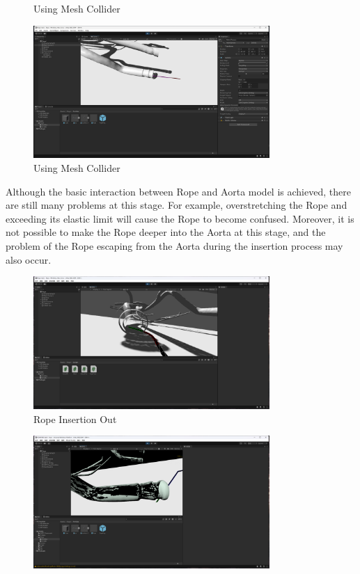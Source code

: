 \documentclass[12pt]{article}
\begin{document}
\begin{enumerate}
\begin{figure}[H]
            \caption{Using Mesh Collider}
      \end{figure}
      \begin{figure}[H]
            \centering
            \includegraphics[width=0.8\textwidth]{with mesh1.png}
            \caption{Using Mesh Collider}
      \end{figure}
      Although the basic interaction between Rope and Aorta model is achieved, there are still many problems at this stage. For example, overstretching the Rope and exceeding its elastic limit will cause the Rope to become confused. Moreover, it is not possible to make the Rope deeper into the Aorta at this stage, and the problem of the Rope escaping from the Aorta during the insertion process may also occur.
      \begin{figure}[H]
            \centering
            \includegraphics[width=0.8\textwidth]{insert out.png}
            \caption{Rope Insertion Out}
      \end{figure}
      \begin{figure}[H]
            \centering
            \includegraphics[width=0.8\textwidth]{jittering.png}

\end{figure}
\end{enumerate}
\end{document}
